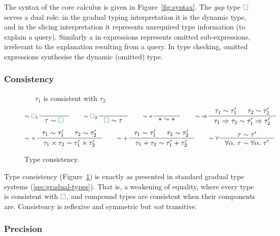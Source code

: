 The syntax of the core calculus is given in Figure~\ref{fig:syntax}. The \textit{gap} type ${\color{teal}\Box}$ serves a dual role: in the gradual typing interpretation it is the dynamic type, and in the slicing interpretation it represents unrequired type information (to explain a query). Similarly a \gap in expressions represents omitted sub-expressions, irrelevant to the explanation resulting from a query. In type checking, omitted expressions synthesise the dynamic (omitted) type.

\subsubsection{\yo Consistency}

\begin{figure}[t]
\ \ \ $\tau_1$ is consistent with $\tau_2$
\[\inference[$\sim\gap_1$]{}{\tau \sim \gap} \qquad
  \inference[$\sim\gap_2$]{}{\gap \sim \tau} \qquad
  \inference[$\sim{*}$]{}{* \sim *} \qquad
  \inference[$\sim{\Rightarrow}$]{\tau_1 \sim \tau_1' & \tau_2 \sim \tau_2'}{\tau_1 \Rightarrow \tau_2 \sim \tau_1' \Rightarrow \tau_2'}\]
\[\inference[$\sim{\times}$]{\tau_1 \sim \tau_1' & \tau_2 \sim \tau_2'}{\tau_1 \times \tau_2 \sim \tau_1' \times \tau_2'} \qquad
  \inference[$\sim{+}$]{\tau_1 \sim \tau_1' & \tau_2 \sim \tau_2'}{\tau_1 + \tau_2 \sim \tau_1' + \tau_2'} \qquad
  \inference[$\sim{\forall}$]{\tau \sim \tau'}{\forall\alpha.\;\tau \sim \forall\alpha.\;\tau'}\]
\caption{Type consistency.}
\label{fig:consistency}
\end{figure}

Type consistency (Figure~\ref{fig:consistency}) is exactly as presented in standard gradual type systems (\cref{sec:gradual-types}). That is, a weakening of equality, where every type is consistent with ${\color{teal}\Box}$, and compound types are consistent when their components are. Consistency is reflexive and symmetric but \textit{not} transitive.

\subsubsection{\yo Precision}

